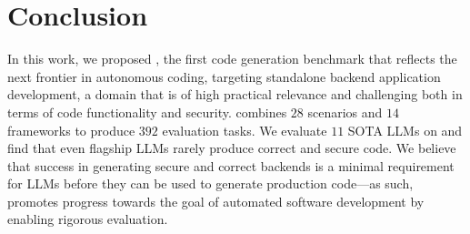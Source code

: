 \section{Conclusion}
\label{sec:conclusion}

In this work, we proposed \benchmark{}, the first code generation benchmark that reflects the next frontier in autonomous coding, targeting standalone backend application development, a domain that is of high practical relevance and challenging both in terms of code functionality and security.
\benchmark{} combines $28$ scenarios and $14$ frameworks to produce $392$ evaluation tasks. We evaluate $11$ SOTA LLMs on \benchmark{} and find that even flagship LLMs rarely produce correct and secure code. 
We believe that success in generating secure and correct backends is a minimal requirement for LLMs before they can be used to generate production code---as such, \benchmark{} promotes progress towards the goal of automated software development by enabling rigorous evaluation.
